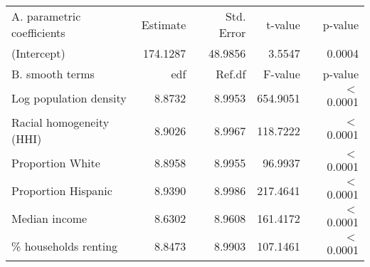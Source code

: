 \begin{table}[ht]
\centering
\begin{tabular}{lrrrr}
   \hline
A. parametric coefficients & Estimate & Std. Error & t-value & p-value \\ 
  (Intercept) & 174.1287 & 48.9856 & 3.5547 & 0.0004 \\ 
   \hline
B. smooth terms & edf & Ref.df & F-value & p-value \\ 
  Log population density & 8.8732 & 8.9953 & 654.9051 & $<$ 0.0001 \\ 
  Racial homogeneity (HHI) & 8.9026 & 8.9967 & 118.7222 & $<$ 0.0001 \\ 
  Proportion White & 8.8958 & 8.9955 & 96.9937 & $<$ 0.0001 \\ 
  Proportion Hispanic & 8.9390 & 8.9986 & 217.4641 & $<$ 0.0001 \\ 
  Median income & 8.6302 & 8.9608 & 161.4172 & $<$ 0.0001 \\ 
  \% households renting & 8.8473 & 8.9903 & 107.1461 & $<$ 0.0001 \\ 
   \hline
\end{tabular}
\caption{ } 
\label{Demographic GAM}
\end{table}
